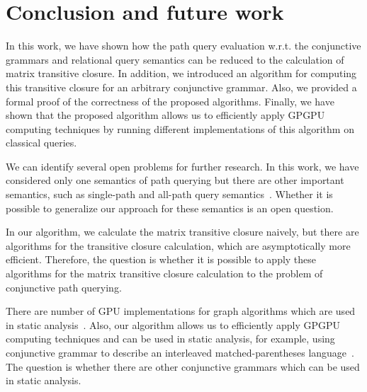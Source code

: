 \section{Conclusion and future work} \label{section_conclusion}
In this work, we have shown how the path query evaluation w.r.t. the conjunctive grammars and relational query semantics can be reduced to the calculation of matrix transitive closure. In addition, we introduced an algorithm for computing this transitive closure for an arbitrary conjunctive grammar. Also, we provided a formal proof of the correctness of the proposed algorithms. Finally, we have shown that the proposed algorithm allows us to efficiently apply GPGPU computing techniques by running different implementations of this algorithm on classical queries. 

We can identify several open problems for further research. In this work, we have considered only one semantics of path querying but there are other important semantics, such as single-path and all-path query semantics~\cite{hellingsPathQuerying}. Whether it is possible to generalize our approach for these semantics is an open question.

In our algorithm, we calculate the matrix transitive closure naively, but there are algorithms for the transitive closure calculation, which are asymptotically more efficient. Therefore, the question is whether it is possible to apply these algorithms for the matrix transitive closure calculation to the problem of conjunctive path querying.

There are number of GPU implementations for graph algorithms which are used in static analysis~\cite{mendez2012gpu,su2013accelerating,su2016efficient}. Also, our algorithm  allows us to efficiently apply GPGPU computing techniques and can be used in static analysis, for example, using conjunctive grammar to describe an interleaved matched-parentheses language~\cite{zhang2017context}. The question is whether there are other conjunctive grammars which can be used in static analysis.
